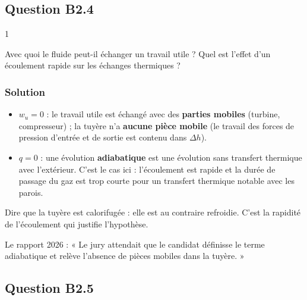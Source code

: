 \documentclass[11pt,a4paper]{article}
\providecommand{\tightlist}{\setlength{\itemsep}{0pt}\setlength{\parskip}{0pt}}
\begin{document}
\hypertarget{question-b2.4}{%
\subsection{Question B2.4}\label{question-b2.4}}

\begin{indication}{1}

Avec quoi le fluide peut-il échanger un travail utile ? Quel est l'effet d'un écoulement rapide sur les échanges thermiques ?

\end{indication}

\hypertarget{solution-32}{%
\subsubsection{Solution}\label{solution-32}}

\begin{itemize}
\tightlist
\item
  \(w_u = 0\) : le travail utile est échangé avec des \textbf{parties mobiles} (turbine, compresseur) ; la tuyère n'a \textbf{aucune pièce mobile} (le travail des forces de pression d'entrée et de sortie est contenu dans \(\Delta h\)).
\item
  \(q = 0\) : une évolution \textbf{adiabatique} est une évolution sans transfert thermique avec l'extérieur. C'est le cas ici : l'écoulement est rapide et la durée de passage du gaz est trop courte pour un transfert thermique notable avec les parois.
\end{itemize}

\begin{piege}

Dire que la tuyère est calorifugée : elle est au contraire refroidie. C'est la rapidité de l'écoulement qui justifie l'hypothèse.

\end{piege}

\begin{jury}

Le rapport 2026 : « Le jury attendait que le candidat définisse le terme adiabatique et relève l'absence de pièces mobiles dans la tuyère. »

\end{jury}

\hypertarget{question-b2.5}{%
\subsection{Question B2.5}\label{question-b2.5}}
\end{document}
